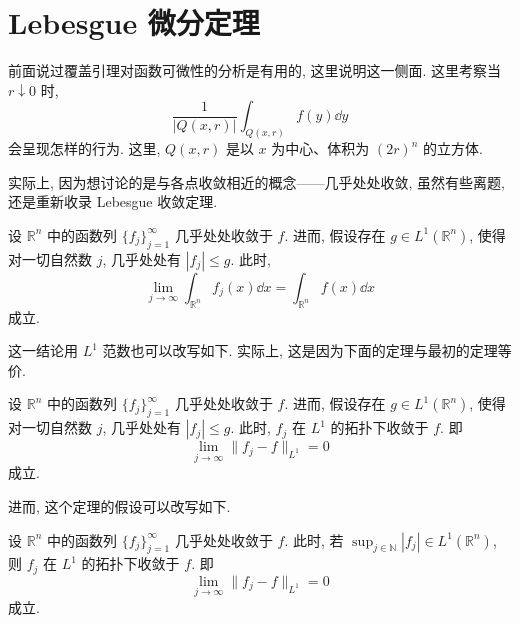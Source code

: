
\section{Lebesgue 微分定理}\label{sec:3.3}













前面说过覆盖引理对函数可微性的分析是有用的, 这里说明这一侧面. 这里考察当 $r \downarrow 0$ 时,
\[
\frac{1}{|Q(x,r)|}\int_{Q(x,r)}f(y)\dd y
\]
会呈现怎样的行为. 这里, $Q(x,r)$ 是以 $x$ 为中心、体积为 $(2r)^{n}$ 的立方体.

实际上, 因为想讨论的是与各点收敛相近的概念——几乎处处收敛, 虽然有些离题, 还是重新收录 Lebesgue 收敛定理.

\begin{theorem}\label{thm:3.6}
设 $\mathbb{R}^{n}$ 中的函数列 $\{f_{j}\}_{j=1}^{\infty}$ 几乎处处收敛于 $f$. 进而, 假设存在 $g \in L^{1}(\mathbb{R}^{n})$, 使得对一切自然数 $j$, 几乎处处有 $|f_{j}| \leq g$. 此时,
\[
\lim_{j \to \infty}\int_{\mathbb{R}^{n}}f_{j}(x)\dd x = \int_{\mathbb{R}^{n}}f(x)\dd x
\]
成立.
\end{theorem}

这一结论用 $L^{1}$ 范数也可以改写如下. 实际上, 这是因为下面的定理与最初的定理等价.

\begin{theorem}\label{thm:3.7}
设 $\mathbb{R}^{n}$ 中的函数列 $\{f_{j}\}_{j=1}^{\infty}$ 几乎处处收敛于 $f$. 进而, 假设存在 $g \in L^{1}(\mathbb{R}^{n})$, 使得对一切自然数 $j$, 几乎处处有 $|f_{j}| \leq g$. 此时, $f_{j}$ 在 $L^{1}$ 的拓扑下收敛于 $f$. 即
\[
\lim_{j \to \infty}\|f_{j} - f\|_{L^{1}} = 0
\]
成立.
\end{theorem}

进而, 这个定理的假设可以改写如下.

\begin{theorem}\label{thm:3.8}
设 $\mathbb{R}^{n}$ 中的函数列 $\{f_{j}\}_{j=1}^{\infty}$ 几乎处处收敛于 $f$. 此时, 若 $\sup_{j \in \mathbb{N}}|f_{j}| \in L^{1}(\mathbb{R}^{n})$, 则 $f_{j}$ 在 $L^{1}$ 的拓扑下收敛于 $f$. 即
\[
\lim_{j \to \infty}\|f_{j} - f\|_{L^{1}} = 0
\]
成立.
\end{theorem}

